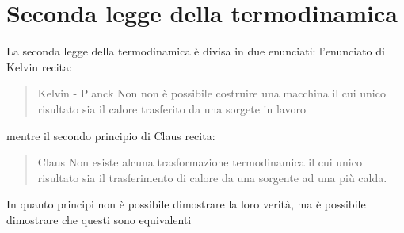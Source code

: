 \chapter{Seconda legge della termodinamica}
    La seconda legge della termodinamica è divisa in due enunciati: l'enunciato di Kelvin recita:
    \begin{quote}{Kelvin - Planck}
        Non non è possibile costruire una macchina il cui unico risultato sia il calore trasferito da una sorgete in lavoro 
    \end{quote}
    mentre il secondo principio di Claus recita:
    \begin{quote}{Claus}
        Non esiste alcuna trasformazione termodinamica il cui unico risultato sia il trasferimento di calore da una sorgente ad una più calda.
    \end{quote}
    In quanto principi non è possibile dimostrare la loro verità, ma è possibile dimostrare che questi sono equivalenti
